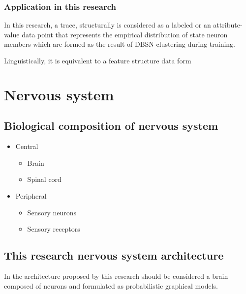 \documentclass[a4paper]{article}
\begin{document}
         \subsubsection{Application in this research}
            In this research, a trace, structurally is considered as a labeled or an attribute-value data point that represents the empirical distribution of state neuron members which are formed as the result of DBSN clustering during training.

            Linguistically, it is equivalent to a feature structure data form \cite{kay-1984-functional-unification-grammar, kasper-1986-a-logical-semantics-for-feature-structures} 

   \section{Nervous system}



      \subsection{Biological composition of nervous system}
         \begin{itemize}
            \item Central
            \begin{itemize}
               \item Brain
               \item Spinal cord
            \end{itemize}
            \item Peripheral
            \begin{itemize}
               \item Sensory neurons
               \item Sensory receptors
            \end{itemize}


         \end{itemize}

      \subsection{This research nervous system architecture}
         In the architecture proposed by this research should be considered a brain composed of neurons and formulated as probabilistic graphical models.
\end{document}
